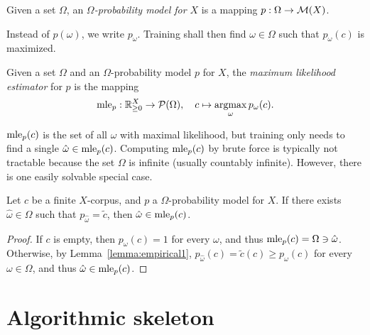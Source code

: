 \begin{definition}
 Given a set $\Omega$, an \emph{$\Omega$-probability model for $X$} is a
 mapping $p:\Omega\to\mathcal M(X)$.
\end{definition}

Instead of $p(\omega)$, we write $p_\omega$. Training shall then find
$\omega\in\Omega$ such that $p_\omega(c)$ is maximized.

\begin{definition}
 Given a set $\Omega$ and an $\Omega$-probability model $p$ for $X$, the
 \emph{maximum likelihood estimator} for $p$ is the mapping
 \[
  \mle_p: \zr_{\geq0}^X \to \up(\Omega),
  \quad
  c \mapsto \argmax_\omega p_\omega(c).
 \]
\end{definition}

$\operatorname{mle}_p(c)$ is the set of all $\omega$ with maximal likelihood, but training
only needs to find a single $\hat\omega \in \operatorname{mle}_p(c)$. Computing $\operatorname{mle}_p(c)$
by brute force is typically not tractable because the set $\Omega$ is infinite
(usually countably infinite). However, there is one easily solvable special
case.

\begin{lemma}\label{lemma:empirical2}
 Let $c$ be a finite $X$-corpus, and $p$ a $\Omega$-probability model for $X$.
 If there exists $\hat\omega\in\Omega$ such that $p_{\hat\omega} = \tilde c$,
 then $\hat\omega\in\operatorname{mle}_p(c)$.
\end{lemma}

\begin{proof}
 If $c$ is empty, then $p_\omega(c) = 1$ for every $\omega$, and thus
 $\operatorname{mle}_p(c) = \Omega \ni \hat\omega$. Otherwise, by
 Lemma~\ref{lemma:empirical1}, $p_{\hat\omega}(c) = \tilde c(c) \geq
 p_\omega(c)$ for every $\omega\in\Omega$, and thus $\hat\omega \in \operatorname{mle}_p(c)$.
\end{proof}

\section{Algorithmic skeleton}


